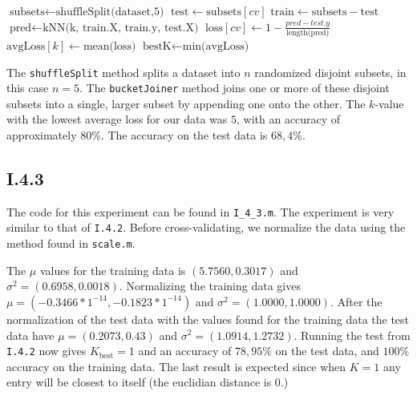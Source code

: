 \begin{algorithmic}
		\State $\text{subsets} \gets \text{shuffleSplit(dataset,5)}$
			\State $\text{test} \gets \text{subsets}[cv]$ 
			\State $\text{train} \gets \text{subsets} - \text{test}$ 
			\State $\text{pred} \gets \text{kNN(k, train.X, train.y, test.X)}$
			\State $\text{loss}[cv] \gets 1 - \frac{pred - test.y}{\text{length(pred)}}$
		\EndFor
		\State $\text{avgLoss}[k] \gets \text{mean(loss)}$
	\EndFor
	\State $\text{bestK} \gets \text{min(avgLoss)}$ 
\end{algorithmic}

The \texttt{shuffleSplit} method splits a dataset into $n$ randomized disjoint
subsets, in this case $n = 5$. The \texttt{bucketJoiner} method joins one or
more of these disjoint subsets into a single, larger subset by appending one
onto the other. The $k$-value with the lowest average loss for our data was
$5$, with an accuracy of approximately $80\%$. The accuracy on the test data is
$68,4\%$.

\subsection{I.4.3}
The code for this experiment can be found in \texttt{I\_4\_3.m}. The experiment
is very similar to that of \texttt{I.4.2}. Before cross-validating, we normalize
the data using the method found in \texttt{scale.m}.

The $\mu$ values for the training data is $(5.7560, 0.3017)$ and $\sigma^2 =
(0.6958, 0.0018)$. Normalizing the training data gives $\mu = (-0.3466*1^{-14},
-0.1823*1^{-14})$ and $\sigma^2 = (1.0000, 1.0000)$. After the normalization of
the test data with the values found for the training data the test data have
$\mu = (0.2073, 0.43)$ and $\sigma^2 = (1.0914, 1.2732)$. Running the test from
\texttt{I.4.2} now gives $K_{\text{best}}=1$ and an accuracy of $78,95\%$ on the
test data, and $100\%$ accuracy on the training data. The last result is
expected since when $K=1$ any entry will be closest to itself (the euclidian
distance is 0.)

